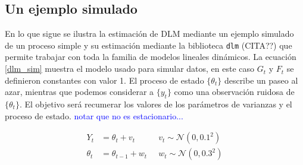 \documentclass[12pt]{article}\usepackage[]{graphicx}\usepackage[]{color}
\begin{document}
\subsection{Un ejemplo simulado \label{implementacionR} }
En lo que sigue se ilustra la estimación de DLM mediante un ejemplo simulado de un proceso simple y su estimación mediante la biblioteca \verb|dlm| (CITA??) que permite trabajar con toda la familia de modelos lineales dinámicos. La ecuación \eqref{dlm_sim} muestra el modelo usado para simular datos,  en este caso $G_t$ y $F_t$ se definieron constantes con valor 1. El proceso de estado $\{\theta_t\}$ describe un paseo al azar, mientras que podemos considerar a $\{y_t\}$ como una observación ruidosa de $\{\theta_t\}$. El objetivo será recumerar los valores de los parámetros de varianzas y el proceso de estado. \textcolor{blue}{notar que no es estacionario...}

\begin{equation}
\begin{aligned}
Y_t&=\theta_t + v_t  \;&\;  v_t \sim \mathcal{N}(0,0.1^2) \\
\theta_t &= \theta_{t-1} + w_t \;&\; w_t \sim \mathcal{N}(0,0.3^2)
\end{aligned}
\label{dlm_sim}
\end{equation}
\end{document}
